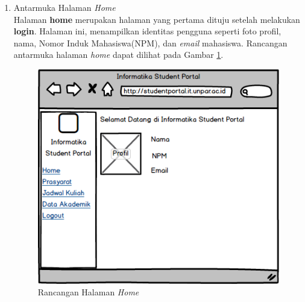 \begin{enumerate}
	\item {Antarmuka Halaman \textit{Home}}\\
	Halaman \textbf{home} merupakan halaman yang pertama dituju setelah melakukan \textbf{login}. Halaman ini, menampilkan identitas pengguna seperti foto profil, nama, Nomor Induk Mahasiswa(NPM), dan \textit{email} mahasiswa. Rancangan antarmuka halaman \textit{home} dapat dilihat pada Gambar \ref{fig:4_ranc_home}.
		\begin{figure}[H]
			\centering
			\includegraphics[scale=0.5]{Gambar/Home_Page}
			\caption{Rancangan Halaman \textit{Home}} 
			\label{fig:4_ranc_home}
		\end{figure}
		

\end{enumerate}
